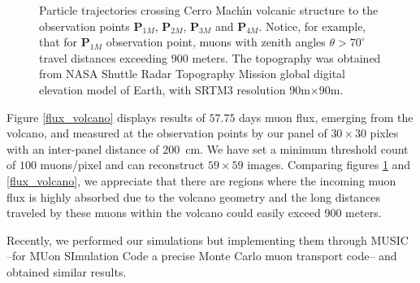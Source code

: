 \documentclass[letterpaper,10pt,titlepage,linenumber]{article}
\begin{document}
\begin{figure}[!ht]
	\caption{Particle trajectories crossing Cerro Mach\'{\i}n volcanic structure to the observation points {\bf P$_{1M}$}, {\bf P$_{2M}$}, {\bf P$_{3M}$} and {\bf P$_{4M}$}. Notice, for example, that for {\bf P$_{1M}$} observation point, muons with zenith angles $\theta>70^\circ$ travel distances exceeding $900$ meters. The topography was obtained from NASA Shuttle Radar Topography Mission global digital elevation model of Earth, with SRTM3 resolution $90$m$\times 90$m.}
  \label{ParticleTrajectories}
\end{figure}

Figure \ref{flux_volcano}  displays results of $57.75$ days muon flux, emerging from the volcano, and measured at the observation points by our panel of $30\times30$ pixles with an inter-panel distance of $200$\, cm. We have set a minimum threshold count of $100$ muons/pixel and can reconstruct $59 \times 59$ images. Comparing figures \ref{ParticleTrajectories} and \ref{flux_volcano}, we appreciate that there are regions where the incoming muon flux is highly absorbed due to the volcano geometry and the long distances traveled by these muons within the volcano could easily exceed  $900$ meters. 

Recently, we performed our simulations but implementing them through MUSIC --for MUon SImulation Code \cite{Kudryavtsev2009} a precise Monte Carlo muon transport code-- and obtained similar results\cite{MossEtal2018}.
\end{document}
